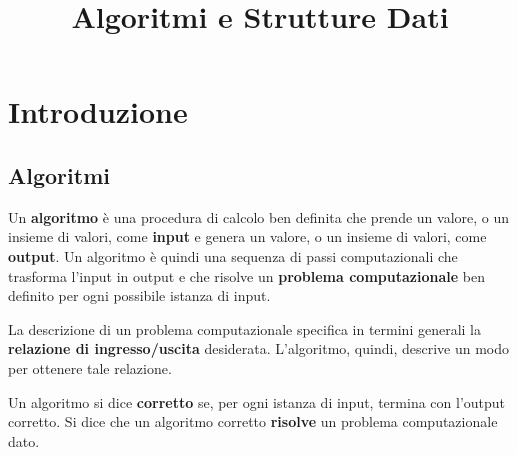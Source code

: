 \documentclass[10pt, a4paper]{report}
\begin{document}
\title{\Huge Algoritmi e Strutture Dati}\date{}
\maketitle
\tableofcontents
\chapter{Introduzione}
\section{Algoritmi}
Un \textbf{algoritmo} è una procedura di calcolo ben definita che prende un valore, o un insieme di valori, come \textbf{input} e genera un valore, o un insieme di valori, come \textbf{output}. Un algoritmo  è quindi una sequenza di passi computazionali che trasforma l'input in output e che risolve un \textbf{problema computazionale}  ben definito per ogni possibile istanza di input.

La descrizione di un problema computazionale specifica in termini generali la \textbf{relazione di ingresso/uscita} desiderata. L'algoritmo, quindi, descrive un modo per ottenere tale relazione.

Un algoritmo si dice \textbf{corretto} se, per ogni istanza di input, termina con l'output corretto. Si dice che un algoritmo  corretto \textbf{risolve} un problema computazionale  dato.
\end{document}
